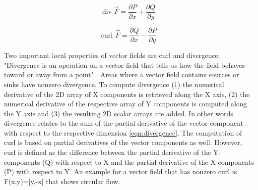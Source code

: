 \begin{equation}
  \text{div } \vec{F} = \frac{\partial P}{\partial x} + \frac{\partial Q}{\partial y}
\label{eqn:divergence}
\end{equation}

\begin{equation}
  \text{curl } \vec{F} = \frac{\partial Q}{\partial x} - \frac{\partial P}{\partial y}
\label{eqn:curl}
\end{equation}

Two important local properties of vector fields are curl and divergence. "Divergence is an operation on a vector field that tells us how the field behaves toward or away from a point" \parencite{strang2018divergence}. Areas where a vector field contains sources or sinks have nonzero divergence. To compute divergence (1) the numerical derivative of the 2D array of X components is retrieved along the X axis, (2) the numerical derivative of the respective array of Y components is computed along the Y axis and (3) the resulting 2D scalar arrays are added. In other words divergence relates to the sum of the partial derivative of the vector component with respect to the respective dimension \ref{eqn:divergence}. The computation of curl is based on partial derivatives of the vector components as well. However, curl is defined as the difference between the partial derivative of the Y-components (Q) with respect to X and the partial derivative of the X-components (P) with respect to Y. An example for a vector field that has nonzero curl is F(x,y)=[y,-x] that shows circular flow.\\

